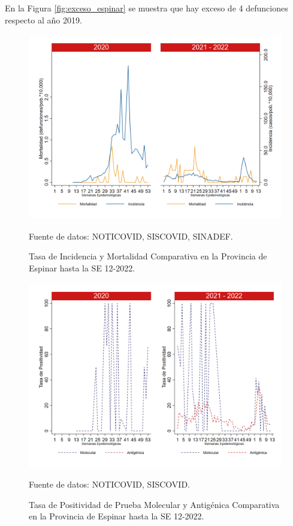 \documentclass[12pt,a4paper,openany]{book}
\begin{document}
		En la Figura \ref{fig:exceso_espinar} se muestra que hay exceso de 4 defunciones respecto al año 2019.
		
		\begin{figure}[h]
			\caption{Tasa de Incidencia y Mortalidad Comparativa en la Provincia de Espinar hasta la SE 12-2022.}\label{fig:inc_mort_espinar}
			\begin{center}
				\includegraphics[width=0.85\linewidth]{../figuras/incidencia_mortalidad_20_21_8.png}
			\end{center}
			{\footnotesize {Fuente de datos: NOTICOVID, SISCOVID, SINADEF.}}
		\end{figure}
		
		\begin{figure}[h]
			\caption{Tasa de Positividad de Prueba Molecular y Antigénica Comparativa en la Provincia de Espinar hasta la SE 12-2022.}\label{fig:positividad_espinar}
			\begin{center}
				\includegraphics[width=0.7\linewidth]{../figuras/positividad_20_21_8.png}
			\end{center}
			{\footnotesize {Fuente de datos: NOTICOVID, SISCOVID.}}
		\end{figure}
		
\end{document}
